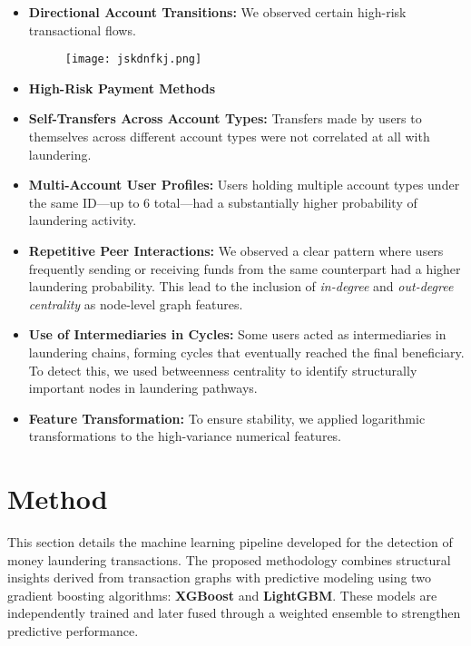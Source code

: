 \documentclass[a4paper]{article}
\begin{document}
\begin{itemize}
    \item \textbf{Directional Account Transitions:} We observed certain high-risk transactional flows. 

    \begin{figure}[h!]
        \centering
        \texttt{[image: jskdnfkj.png]}
        \label{fig:laundering_matrix}
    \end{figure}


    \item \textbf{High-Risk Payment Methods}

    \item \textbf{Self-Transfers Across Account Types:} Transfers made by users to themselves across different account types were not correlated at all with laundering.

    \item \textbf{Multi-Account User Profiles:} Users holding multiple account types under the same ID—up to 6 total—had a substantially higher probability of laundering activity.

    \item \textbf{Repetitive Peer Interactions:} We observed a clear pattern where users frequently sending or receiving funds from the same counterpart had a higher laundering probability. This lead to the inclusion of \textit{in-degree} and \textit{out-degree centrality} as node-level graph features. 

    \item \textbf{Use of Intermediaries in Cycles:} Some users acted as intermediaries in laundering chains, forming cycles that eventually reached the final beneficiary. To detect this, we used betweenness centrality to identify structurally important nodes in laundering pathways.

    \item \textbf{Feature Transformation:} To ensure stability, we applied logarithmic transformations to the high-variance numerical features. 
\end{itemize}

\section{Method}
\label{sec:method}
This section details the machine learning pipeline developed for the detection of money laundering transactions. The proposed methodology combines structural insights derived from transaction graphs with predictive modeling using two gradient boosting algorithms: \textbf{XGBoost} and \textbf{LightGBM}. These models are independently trained and later fused through a weighted ensemble to strengthen predictive performance.
\end{document}
